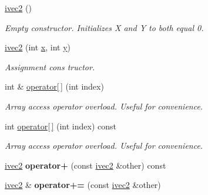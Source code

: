 \begin{DoxyCompactItemize}
\item 
\mbox{\label{structcturtle_1_1ivec2_a98b74bd6df906a25ef700397d6190103}} 
\hyperlink{structcturtle_1_1ivec2_a98b74bd6df906a25ef700397d6190103}{ivec2} ()
\begin{DoxyCompactList}\small\item\em Empty constructor. Initializes X and Y to both equal 0. \end{DoxyCompactList}\item 
\hyperlink{structcturtle_1_1ivec2_a7069d9f7c5ef7505c7c00c55958e0982}{ivec2} (int \hyperlink{structcturtle_1_1ivec2_acf8e72e8e3847b3a62f35bfbe588b637}{x}, int \hyperlink{structcturtle_1_1ivec2_a20914f8516f2f9b8e88e81cdf8415897}{y})
\begin{DoxyCompactList}\small\item\em Assignment cons tructor. \end{DoxyCompactList}\item 
int \& \hyperlink{structcturtle_1_1ivec2_adc88a30605f0f71ea7844956a9473fd9}{operator\mbox{[}$\,$\mbox{]}} (int index)
\begin{DoxyCompactList}\small\item\em Array access operator overload. Useful for convenience. \end{DoxyCompactList}\item 
int \hyperlink{structcturtle_1_1ivec2_aad734cde7ca729a1148b0edd84637e25}{operator\mbox{[}$\,$\mbox{]}} (int index) const
\begin{DoxyCompactList}\small\item\em Array access operator overload. Useful for convenience. \end{DoxyCompactList}\item 
\mbox{\label{structcturtle_1_1ivec2_a14e842f273db8028d6cdbecb86ff43d2}} 
\hyperlink{structcturtle_1_1ivec2}{ivec2} {\bfseries operator+} (const \hyperlink{structcturtle_1_1ivec2}{ivec2} \&other) const
\item 
\mbox{\label{structcturtle_1_1ivec2_a00d55694dbbdb97b59347d68d6e3e027}} 
\hyperlink{structcturtle_1_1ivec2}{ivec2} \& {\bfseries operator+=} (const \hyperlink{structcturtle_1_1ivec2}{ivec2} \&other)
\item 
\mbox{\label{structcturtle_1_1ivec2_aa5b5e61754485417bd0db5a8a04596de}} 

\end{DoxyCompactItemize}

